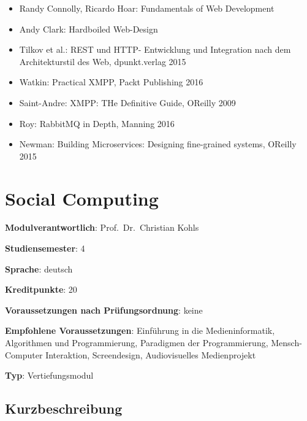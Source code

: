 \begin{itemize}
\tightlist
\item
  Randy Connolly, Ricardo Hoar: Fundamentals of Web Development
\item
  Andy Clark: Hardboiled Web-Design
\item
  Tilkov et al.: REST und HTTP- Entwicklung und Integration nach dem
  Architekturstil des Web, dpunkt.verlag 2015
\item
  Watkin: Practical XMPP, Packt Publishing 2016
\item
  Saint-Andre: XMPP: THe Definitive Guide, OReilly 2009
\item
  Roy: RabbitMQ in Depth, Manning 2016
\item
  Newman: Building Microservices: Designing fine-grained systems,
  OReilly 2015
\end{itemize}

\chapter{Social
Computing\label{/mi-2017/modulbeschreibungen-bachelor/BA_Vertiefung_SocialComputing}}\label{social-computingpathlabelmi-2017modulbeschreibungen-bachelorbaux5fvertiefungux5fsocialcomputing}

\begin{modulHead}
\textbf{Modulverantwortlich}: Prof.~Dr.~Christian
Kohls
\end{modulHead}
\begin{modulHead}
\textbf{Studiensemester}:
4
\end{modulHead}
\begin{modulHead}
\textbf{Sprache}:
deutsch
\end{modulHead}
\begin{modulHead}
\textbf{Kreditpunkte}:
20
\end{modulHead}
\begin{modulHead}
\textbf{Voraussetzungen nach
Prüfungsordnung}:
keine
\end{modulHead}
\begin{modulHead}
\textbf{Empfohlene
Voraussetzungen}: Einführung in die Medieninformatik, Algorithmen und
Programmierung, Paradigmen der Programmierung, Mensch-Computer
Interaktion, Screendesign, Audiovisuelles
Medienprojekt
\end{modulHead}
\begin{modulHead}
\textbf{Typ}:
Vertiefungsmodul
\end{modulHead}


\section*{Kurzbeschreibung\label{/mi-2017/modulbeschreibungen-bachelor/BA_Vertiefung_SocialComputing}}\label{kurzbeschreibungpathlabelmi-2017modulbeschreibungen-bachelorbaux5fvertiefungux5fsocialcomputing}

